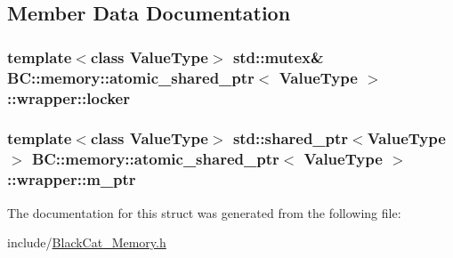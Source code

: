 \subsection{Member Data Documentation}
\subsubsection[{\texorpdfstring{locker}{locker}}]{\setlength{\rightskip}{0pt plus 5cm}template$<$class Value\+Type$>$ std\+::mutex\& {\bf B\+C\+::memory\+::atomic\+\_\+shared\+\_\+ptr}$<$ Value\+Type $>$\+::wrapper\+::locker}\hypertarget{structBC_1_1memory_1_1atomic__shared__ptr_1_1wrapper_a77d6b201fe173aff6f2f97c1708821f4}{}\label{structBC_1_1memory_1_1atomic__shared__ptr_1_1wrapper_a77d6b201fe173aff6f2f97c1708821f4}
\subsubsection[{\texorpdfstring{m\+\_\+ptr}{m_ptr}}]{\setlength{\rightskip}{0pt plus 5cm}template$<$class Value\+Type$>$ std\+::shared\+\_\+ptr$<$Value\+Type$>$ {\bf B\+C\+::memory\+::atomic\+\_\+shared\+\_\+ptr}$<$ Value\+Type $>$\+::wrapper\+::m\+\_\+ptr}\hypertarget{structBC_1_1memory_1_1atomic__shared__ptr_1_1wrapper_a8de6277c53a3732d200d36193a9086a0}{}\label{structBC_1_1memory_1_1atomic__shared__ptr_1_1wrapper_a8de6277c53a3732d200d36193a9086a0}


The documentation for this struct was generated from the following file\+:\begin{DoxyCompactItemize}
\item 
include/\hyperlink{BlackCat__Memory_8h}{Black\+Cat\+\_\+\+Memory.\+h}\end{DoxyCompactItemize}
